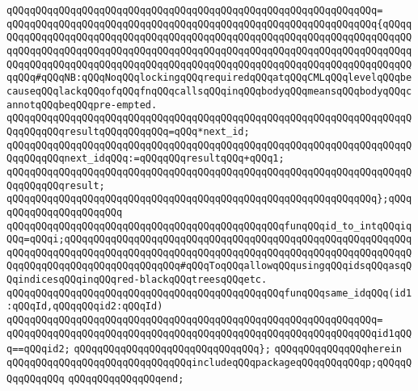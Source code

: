 \verb|qQQqqQQqqQQqqQQqqQQqqQQqqQQqqQQqqQQqqQQqqQQqqQQqqQQqqQQqqQQqqQQq=|\newline
\verb|qQQqqQQqqQQqqQQqqQQqqQQqqQQqqQQqqQQqqQQqqQQqqQQqqQQqqQQqqQQqqQQq{qQQqqQQqqQQqqQQqqQQqqQQqqQQqqQQqqQQqqQQqqQQqqQQqqQQqqQQqqQQqqQQqqQQqqQQqqQQqqQQqqQQqqQQqqQQqqQQqqQQqqQQqqQQqqQQqqQQqqQQqqQQqqQQqqQQqqQQqqQQqqQQqqQQqqQQqqQQqqQQqqQQqqQQqqQQqqQQqqQQqqQQqqQQqqQQqqQQqqQQqqQQqqQQqqQQqqQQqqQQq#qQQqNB:qQQqNoqQQqlockingqQQqrequiredqQQqatqQQqCMLqQQqlevelqQQqbecauseqQQqlackqQQqofqQQqfnqQQqcallsqQQqinqQQqbodyqQQqmeansqQQqbodyqQQqcannotqQQqbeqQQqpre-empted.|\newline
\verb|qQQqqQQqqQQqqQQqqQQqqQQqqQQqqQQqqQQqqQQqqQQqqQQqqQQqqQQqqQQqqQQqqQQqqQQqqQQqqQQqresultqQQqqQQqqQQq=qQQq*next_id;|\newline
\verb|qQQqqQQqqQQqqQQqqQQqqQQqqQQqqQQqqQQqqQQqqQQqqQQqqQQqqQQqqQQqqQQqqQQqqQQqqQQqqQQqnext_idqQQq:=qQQqqQQqresultqQQq+qQQq1;|\newline
\verb|qQQqqQQqqQQqqQQqqQQqqQQqqQQqqQQqqQQqqQQqqQQqqQQqqQQqqQQqqQQqqQQqqQQqqQQqqQQqqQQqresult;|\newline
\verb|qQQqqQQqqQQqqQQqqQQqqQQqqQQqqQQqqQQqqQQqqQQqqQQqqQQqqQQqqQQqqQQq};qQQqqQQqqQQqqQQqqQQqqQQq|\newline
\newline
\verb|qQQqqQQqqQQqqQQqqQQqqQQqqQQqqQQqqQQqqQQqqQQqqQQqfunqQQqid_to_intqQQqiqQQq=qQQqi;qQQqqQQqqQQqqQQqqQQqqQQqqQQqqQQqqQQqqQQqqQQqqQQqqQQqqQQqqQQqqQQqqQQqqQQqqQQqqQQqqQQqqQQqqQQqqQQqqQQqqQQqqQQqqQQqqQQqqQQqqQQqqQQqqQQqqQQqqQQqqQQqqQQqqQQqqQQqqQQq#qQQqToqQQqallowqQQqusingqQQqidsqQQqasqQQqindicesqQQqinqQQqred-blackqQQqtreesqQQqetc.|\newline
\newline
\verb|qQQqqQQqqQQqqQQqqQQqqQQqqQQqqQQqqQQqqQQqqQQqqQQqfunqQQqsame_idqQQq(id1:qQQqId,qQQqqQQqid2:qQQqId)|\newline
\verb|qQQqqQQqqQQqqQQqqQQqqQQqqQQqqQQqqQQqqQQqqQQqqQQqqQQqqQQqqQQqqQQq=|\newline
\verb|qQQqqQQqqQQqqQQqqQQqqQQqqQQqqQQqqQQqqQQqqQQqqQQqqQQqqQQqqQQqqQQqid1qQQq==qQQqid2;|\newline
\verb|qQQqqQQqqQQqqQQqqQQqqQQqqQQqqQQq};|\newline
\verb|qQQqqQQqqQQqqQQqherein|\newline
\verb|qQQqqQQqqQQqqQQqqQQqqQQqqQQqqQQqincludeqQQqpackageqQQqqQQqqQQqp;qQQqqQQqqQQqqQQq|\newline
\verb|qQQqqQQqqQQqqQQqend;|\newline
\newline
\newline
